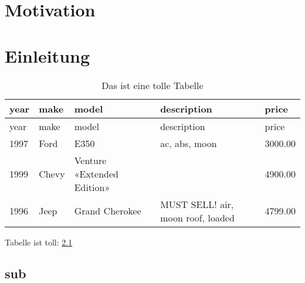 \hypertarget{motivation}{%
\chapter{Motivation}\label{motivation}}

\hypertarget{einleitung}{%
\chapter{Einleitung}\label{einleitung}}

\begin{longtable}[]{@{}lllll@{}}
\caption{Das ist eine tolle Tabelle
\label{Das_ist_eine_tolle_Tabelle.csv}}\tabularnewline
\toprule
year & make & model & description & price\tabularnewline
\midrule
\endfirsthead
\toprule
year & make & model & description & price\tabularnewline
\midrule
\endhead
1997 & Ford & E350 & ac, abs, moon & 3000.00\tabularnewline
1999 & Chevy & Venture «Extended Edition» & & 4900.00\tabularnewline
1996 & Jeep & Grand Cherokee & MUST SELL! air, moon roof, loaded &
4799.00\tabularnewline
\bottomrule
\end{longtable}

Tabelle ist toll: \ref{Das_ist_eine_tolle_Tabelle.csv}

\hypertarget{sub}{%
\section{sub}\label{sub}}

